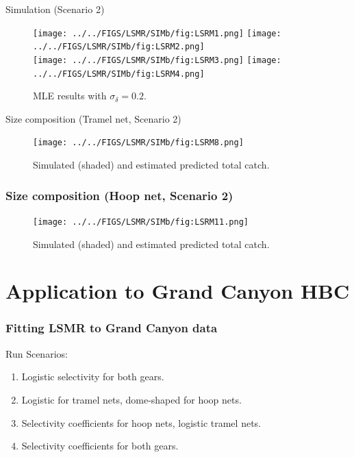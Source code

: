 \documentclass{beamer}
\begin{document}
\begin{frame}{Simulation (Scenario 2)}
	\begin{figure}[htbp]
		\centering
			\texttt{[image: ../../FIGS/LSMR/SIMb/fig:LSRM1.png]}
			\texttt{[image: ../../FIGS/LSMR/SIMb/fig:LSRM2.png]}\\
			\texttt{[image: ../../FIGS/LSMR/SIMb/fig:LSRM3.png]}
			\texttt{[image: ../../FIGS/LSMR/SIMb/fig:LSRM4.png]}
		\caption{MLE results with $\sigma_\delta = 0.2$.}
		\label{fig:FIGS_LSMR_SIMb_fig:LSRM1}
	\end{figure}
	
		
\end{frame}

\begin{frame}{Size composition (Tramel net, Scenario 2)}
	\only<1>
	{
		\begin{figure}[htbp]
			\centering
				\texttt{[image: ../../FIGS/LSMR/SIMb/fig:LSRM8.png]}
			\caption{Simulated (shaded) and estimated predicted total catch.}
			\label{fig:FIGS_LSMR_SIMb_fig:LSRM8}
		\end{figure}
	}
	{
	\frametitle{Size composition (Hoop net, Scenario 2)}
		\begin{figure}[htbp]
			\centering
				\texttt{[image: ../../FIGS/LSMR/SIMb/fig:LSRM11.png]}
			\caption{Simulated (shaded) and estimated predicted total catch.}
			\label{fig:FIGS_LSMR_SIMb_fig:LSRM11}
		\end{figure}
	}
	
\end{frame}


\section[Grand Canyon]{Application to Grand Canyon HBC} %
\label{sec:application_to_grand_canyon_hbc}
\begin{frame}
	\frametitle{Fitting LSMR to Grand Canyon data}
	\begin{block}{Run Scenarios:}
		\begin{enumerate}
			\item Logistic selectivity for both gears.
			\item Logistic for tramel nets, dome-shaped for hoop nets.
			\item Selectivity coefficients for hoop nets, logistic tramel nets.
			\item Selectivity coefficients for both gears.
		\end{enumerate}
		
	\end{block}
\end{frame}
\end{document}
